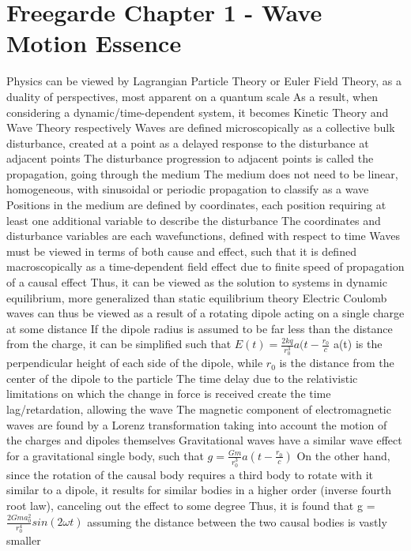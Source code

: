 \documentclass[11 pt, twoside]{article}
\newenvironment{outline*}
{
	\begin{outline}[enumerate]
	}
	{\end{outline}
}
\begin{document}
\section{Freegarde Chapter 1 - Wave Motion Essence}
\begin{outline*}
\1 Physics can be viewed by Lagrangian Particle Theory or Euler Field Theory, as a duality of perspectives, most apparent on a quantum scale
\2 As a result, when considering a dynamic/time-dependent system, it becomes Kinetic Theory and Wave Theory respectively
\1 Waves are defined microscopically as a collective bulk disturbance, created at a point as a delayed response to the disturbance at adjacent points
\2 The disturbance progression to adjacent points is called the propagation, going through the medium
\2 The medium does not need to be linear, homogeneous, with sinusoidal or periodic propagation to classify as a wave
\2 Positions in the medium are defined by coordinates, each position requiring at least one additional variable to describe the disturbance
\3 The coordinates and disturbance variables are each wavefunctions, defined with respect to time
\1 Waves must be viewed in terms of both cause and effect, such that it is defined macroscopically as a time-dependent field effect due to finite speed of propagation of a causal effect
\2 Thus, it can be viewed as the solution to systems in dynamic equilibrium, more generalized than static equilibrium theory
\2 Electric Coulomb waves can thus be viewed as a result of a rotating dipole acting on a single charge at some distance
\3 If the dipole radius is assumed to be far less than the distance from the charge, it can be simplified such that $E(t) = \frac{2kq}{r_0^3}a(t - \frac{r_0}{c}$
\4 a(t) is the perpendicular height of each side of the dipole, while $r_0$ is the distance from the center of the dipole to the particle
\4 The time delay due to the relativistic limitations on which the change in force is received create the time lag/retardation, allowing the wave
\4 The magnetic component of electromagnetic waves are found by a Lorenz transformation taking into account the motion of the charges and dipoles themselves
\3 Gravitational waves have a similar wave effect for a gravitational single body, such that $g = \frac{Gm}{r_0^3}a(t - \frac{r_0}{c})$
\4 On the other hand, since the rotation of the causal body requires a third body to rotate with it similar to a dipole, it results for similar bodies in a higher order (inverse fourth root law), canceling out the effect to some degree
\4 Thus, it is found that g = $\frac{2Gma_0^2}{r_0^4}sin(2\omega t)$ assuming the distance between the two causal bodies is vastly smaller

\end{outline*}
\end{document}
